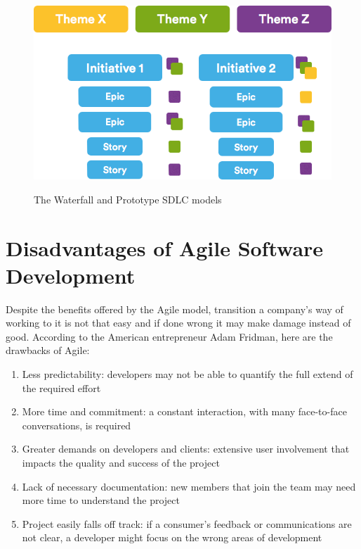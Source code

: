 	\begin{figure}[H]
		\centering
		\includegraphics[width=\textwidth]{resources/Themes}\\
		\caption{The Waterfall and Prototype SDLC models}
	\end{figure}
	
	
\section{Disadvantages of Agile Software Development}
	Despite the benefits offered by the Agile model, transition a company's way of working to it is not that easy and if done wrong it may make damage instead of good.
	According to the American entrepreneur Adam Fridman, here are the drawbacks\cite{massive-downside-of-agile} of Agile:
	\begin{enumerate}
		\item Less predictability: developers may not be able to quantify the full extend of the required effort
		\item More time and commitment: a constant interaction, with many face-to-face conversations, is required
		\item Greater demands on developers and clients: extensive user involvement that impacts the quality and success of the project
		\item Lack of necessary documentation: new members that join the team may need more time to understand the project
		\item Project easily falls off track: if a consumer's feedback or communications are not clear, a developer might focus on the wrong areas of development
	\end{enumerate}
	
